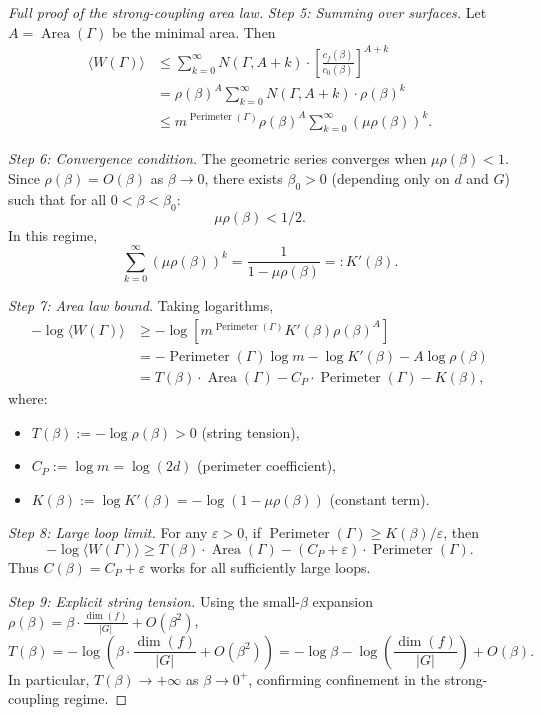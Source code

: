 \documentclass[11pt]{amsart}
\begin{document}
\begin{proof}[Full proof of the strong-coupling area law]
\emph{Step 5: Summing over surfaces.} Let $A = \operatorname{Area}(\Gamma)$ be the minimal area. Then
\begin{align}
  \langle W(\Gamma) \rangle &\le \sum_{k=0}^{\infty} N(\Gamma, A+k) \cdot \left[\frac{c_f(\beta)}{c_0(\beta)}\right]^{A+k} \\
  &= \rho(\beta)^A \sum_{k=0}^{\infty} N(\Gamma, A+k) \cdot \rho(\beta)^k \\
  &\le m^{\operatorname{Perimeter}(\Gamma)} \rho(\beta)^A \sum_{k=0}^{\infty} (\mu \rho(\beta))^k.
\end{align}

\emph{Step 6: Convergence condition.} The geometric series converges when $\mu \rho(\beta) < 1$. Since $\rho(\beta) = O(\beta)$ as $\beta \to 0$, there exists $\beta_0 > 0$ (depending only on $d$ and $G$) such that for all $0 < \beta < \beta_0$:
\[
  \mu \rho(\beta) < 1/2.
\]
In this regime,
\[
  \sum_{k=0}^{\infty} (\mu \rho(\beta))^k = \frac{1}{1 - \mu \rho(\beta)} =: K'(\beta).
\]

\emph{Step 7: Area law bound.} Taking logarithms,
\begin{align}
  -\log\langle W(\Gamma) \rangle &\ge -\log[m^{\operatorname{Perimeter}(\Gamma)} K'(\beta) \rho(\beta)^A] \\
  &= -\operatorname{Perimeter}(\Gamma) \log m - \log K'(\beta) - A \log \rho(\beta) \\
  &= T(\beta) \cdot \operatorname{Area}(\Gamma) - C_P \cdot \operatorname{Perimeter}(\Gamma) - K(\beta),
\end{align}
where:
\begin{itemize}
  \item $T(\beta) := -\log \rho(\beta) > 0$ (string tension),
  \item $C_P := \log m = \log(2d)$ (perimeter coefficient),
  \item $K(\beta) := \log K'(\beta) = -\log(1 - \mu \rho(\beta))$ (constant term).
\end{itemize}

\emph{Step 8: Large loop limit.} For any $\varepsilon > 0$, if $\operatorname{Perimeter}(\Gamma) \ge K(\beta)/\varepsilon$, then
\[
  -\log\langle W(\Gamma) \rangle \ge T(\beta) \cdot \operatorname{Area}(\Gamma) - (C_P + \varepsilon) \cdot \operatorname{Perimeter}(\Gamma).
\]
Thus $C(\beta) = C_P + \varepsilon$ works for all sufficiently large loops.

\emph{Step 9: Explicit string tension.} Using the small-$\beta$ expansion $\rho(\beta) = \beta \cdot \frac{\dim(f)}{|G|} + O(\beta^2)$,
\[
  T(\beta) = -\log\left(\beta \cdot \frac{\dim(f)}{|G|} + O(\beta^2)\right) = -\log\beta - \log\left(\frac{\dim(f)}{|G|}\right) + O(\beta).
\]
In particular, $T(\beta) \to +\infty$ as $\beta \to 0^+$, confirming confinement in the strong-coupling regime.
\end{proof}
\end{document}
